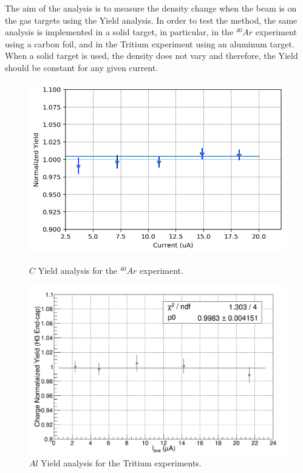 \documentclass[preprint,12pt]{elsarticle}
\begin{document}
The aim of the analysis is to measure the density change when the beam is on the gas targets using the Yield analysis. In order to test the method, the same analysis is implemented in a solid target, in particular, in the $^{40}Ar$ experiment using a carbon foil, and in the Tritium experiment using an aluminum target. When a solid target is used, the density does not vary and therefore, the Yield should be constant for any given current.

\begin{figure}[htbp]
  \begin{minipage}[b]{0.5\linewidth}
    \centering
    \includegraphics[width=\linewidth]{images/argon_solid.png}
    \caption{$C$ Yield analysis for the $^{40}Ar$ experiment.}
    \label{fig:ar_solid}
  \end{minipage}
  \hspace{0.5cm}
  \begin{minipage}[b]{0.5\linewidth}
    \centering
    \includegraphics[width=\linewidth]{images/upstream.png}
    \caption{$Al$ Yield analysis for the Tritium experiments. }
    \label{fig:3H_solid}
  \end{minipage}
\end{figure}
\end{document}
